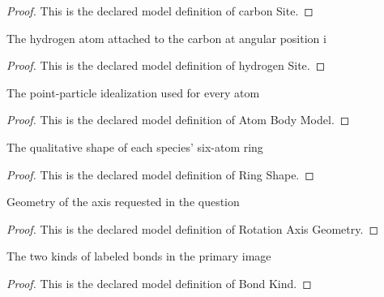 \begin{proof}
  This is the declared model definition of carbon Site.
\end{proof}
\begin{definition}
  \label{def:physics:phyx-mini-0538:phyxminiproblems-problemphyxmini0538-hydrogensite}
  The hydrogen atom attached to the carbon at angular position i
\end{definition}
\begin{proof}
  This is the declared model definition of hydrogen Site.
\end{proof}
\begin{definition}
  \label{def:physics:phyx-mini-0538:phyxminiproblems-problemphyxmini0538-atombodymodel}
  The point-particle idealization used for every atom
\end{definition}
\begin{proof}
  This is the declared model definition of Atom Body Model.
\end{proof}
\begin{definition}
  \label{def:physics:phyx-mini-0538:phyxminiproblems-problemphyxmini0538-ringshape}
  The qualitative shape of each species' six-atom ring
\end{definition}
\begin{proof}
  This is the declared model definition of Ring Shape.
\end{proof}
\begin{definition}
  \label{def:physics:phyx-mini-0538:phyxminiproblems-problemphyxmini0538-rotationaxisgeometry}
  Geometry of the axis requested in the question
\end{definition}
\begin{proof}
  This is the declared model definition of Rotation Axis Geometry.
\end{proof}
\begin{definition}
  \label{def:physics:phyx-mini-0538:phyxminiproblems-problemphyxmini0538-bondkind}
  The two kinds of labeled bonds in the primary image
\end{definition}
\begin{proof}
  This is the declared model definition of Bond Kind.
\end{proof}

